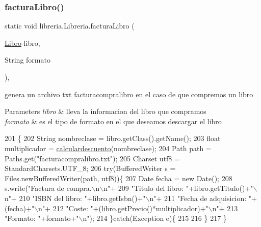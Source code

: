 \subsubsection{\texorpdfstring{factura\+Libro()}{facturaLibro()}}
{\footnotesize\ttfamily static void libreria.\+Libreria.\+factura\+Libro (\begin{DoxyParamCaption}\item[{\mbox{\hyperlink{classlibreria_1_1_libro}{Libro}}}]{libro,  }\item[{String}]{formato }\end{DoxyParamCaption})\hspace{0.3cm}{\ttfamily [inline]}, {\ttfamily [static]}}

genera un archivo txt facturacompralibro en el caso de que compremos un libro 
\begin{DoxyParams}{Parameters}
{\em libro} & lleva la informacion del libro que compramos \\
\hline
{\em formato} & es el tipo de formato en el que deseamos descargar el libro \\
\hline
\end{DoxyParams}

\begin{DoxyCode}
201                                                                   \{
202          String nombreclase = libro.getClass().getName();
203          \textcolor{keywordtype}{float} multiplicador = \mbox{\hyperlink{classlibreria_1_1_libreria_a33f2cc093f3c15f09e146283e0c025d7}{calculardescuento}}(nombreclase);
204          Path path = Paths.get(\textcolor{stringliteral}{"facturacompralibro.txt"});
205          Charset utf8 = StandardCharsets.UTF\_8;
206          \textcolor{keywordflow}{try}(BufferedWriter s = Files.newBufferedWriter(path, utf8))\{
207              Date fecha = \textcolor{keyword}{new} Date();
208              s.write(\textcolor{stringliteral}{"Factura de compra.\(\backslash\)n\(\backslash\)n"}+
209                      \textcolor{stringliteral}{"Titulo del libro: "}+libro.getTitulo()+\textcolor{stringliteral}{"\(\backslash\)n"}+
210                      \textcolor{stringliteral}{"ISBN del libro: "}+libro.getIsbn()+\textcolor{stringliteral}{"\(\backslash\)n"}+
211                      \textcolor{stringliteral}{"Fecha de adquisicion: "}+(fecha)+\textcolor{stringliteral}{"\(\backslash\)n"}+
212                      \textcolor{stringliteral}{"Coste: "}+(libro.getPrecio()*multiplicador)+\textcolor{stringliteral}{"\(\backslash\)n"}+
213                      \textcolor{stringliteral}{"Formato: "}+formato+\textcolor{stringliteral}{"\(\backslash\)n"});
214          \}\textcolor{keywordflow}{catch}(Exception e)\{
215              
216          \}
217      \}
\end{DoxyCode}
\mbox{\label{classlibreria_1_1_libreria_ad54897f12a3077bb2f29f51663049d20}} 
